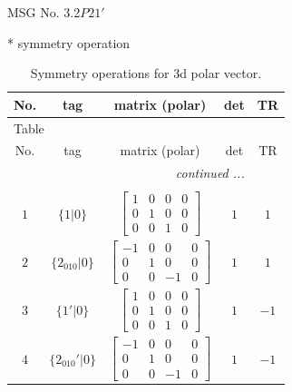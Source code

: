 \documentclass[fleqn,8pt]{jsarticle}
\begin{document}
\setcounter{MaxMatrixCols}{32}

\renewcommand{\tablename}{Table~}
\renewcommand{\figurename}{Figure~}
\begin{center}
\LARGE
MSG No. 3.2\quad$P21'$
\end{center}
* symmetry operation
\renewcommand{\arraystretch}{1.3}
\begin{longtable}{ccccc}
\caption{Symmetry operations for 3d polar vector.}
 \\
 \hline \hline
No. & tag & matrix (polar) & det & TR \\ \hline \endfirsthead

\multicolumn{4}{l}{\tablename\ \thetable{}} \\
 \hline \hline
No. & tag & matrix (polar) & det & TR \\ \hline \endhead

 \hline \hline
\multicolumn{4}{r}{\footnotesize\it continued ...} \\ \endfoot

 \hline \hline
\multicolumn{4}{r}{} \\ \endlastfoot

$ 1 $ & $ \{1|0\} $ & $ \begin{bmatrix} 1 & 0 & 0 & 0 \\ 0 & 1 & 0 & 0 \\ 0 & 0 & 1 & 0 \end{bmatrix} $ & $ 1 $ & $ 1 $ \\ \hline
$ 2 $ & $ \{2{}_{010}|0\} $ & $ \begin{bmatrix} -1 & 0 & 0 & 0 \\ 0 & 1 & 0 & 0 \\ 0 & 0 & -1 & 0 \end{bmatrix} $ & $ 1 $ & $ 1 $ \\ \hline
$ 3 $ & $ \{1{}'|0\} $ & $ \begin{bmatrix} 1 & 0 & 0 & 0 \\ 0 & 1 & 0 & 0 \\ 0 & 0 & 1 & 0 \end{bmatrix} $ & $ 1 $ & $ -1 $ \\ \hline
$ 4 $ & $ \{2{}_{010}{}'|0\} $ & $ \begin{bmatrix} -1 & 0 & 0 & 0 \\ 0 & 1 & 0 & 0 \\ 0 & 0 & -1 & 0 \end{bmatrix} $ & $ 1 $ & $ -1 $ \\
\end{longtable}
\end{document}
